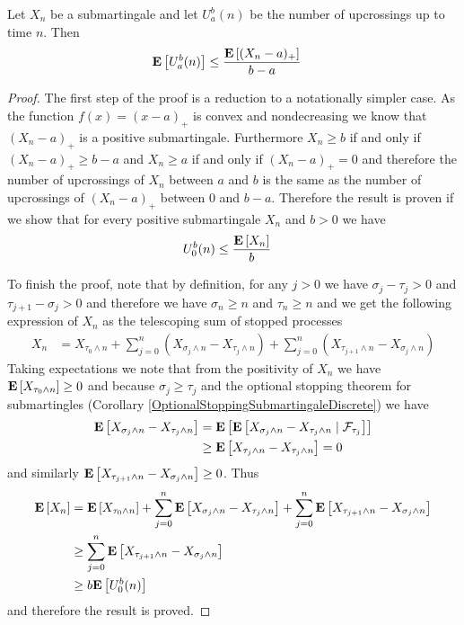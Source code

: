 \begin{lem}\label{UpcrossingInequalityDiscrete}Let $X_n$ be a
  submartingale and let $U_a^b(n)$ be the number of upcrossings up to
  time $n$.  Then
\begin{align*}
\expectation{U_a^b(n)} &\leq \frac{\expectation{(X_n-a)_+}}{b-a}
\end{align*}
\end{lem}
\begin{proof}
The first step of the proof is a reduction to a notationally simpler
case.  As the function $f(x) = (x -a)_+$ is convex and nondecreasing we know
that $(X_n - a)_+$ is a positive submartingale.  Furthermore $X_n \geq b$ if
and only if $(X_n - a)_+ \geq b-a$ and $X_n \geq a$ if and only if
$(X_n -a)_+ = 0$ and therefore the number of upcrossings of $X_n$
between $a$ and $b$ is the same as the number of upcrossings of $(X_n
- a)_+$ between $0$ and $b-a$.  Therefore the result is proven if we
show that for every positive submartingale $X_n$ and $b>0$ we have 
\begin{align*}
U_0^b (n) &\leq \frac{\expectation{X_n}}{b}
\end{align*}

To finish the proof, note that by definition, for any $j>0$ we have $\sigma_j -
\tau_j > 0$ and $\tau_{j+1} - \sigma_j > 0$ and therefore we have
$\sigma_n \geq n$ and $\tau_n \geq n$ and we get the following
expression of $X_n$ as the telescoping sum of stopped processes
\begin{align*}
X_n &= X_{\tau_0 \wedge n} + \sum_{j=0}^n \left ( X_{\sigma_j \wedge n} - X_{\tau_j
    \wedge n} \right) + \sum_{j=0}^n \left ( X_{\tau_{j+1} \wedge n} - X_{\sigma_j
    \wedge n} \right)
\end{align*}
Taking expectations we note that from the positivity of $X_n$ we have
$\expectation{X_{\tau_0 \wedge n}}\geq 0$ and because $\sigma_j \geq
\tau_j$ and the optional stopping theorem for submartingles
(Corollary \ref{OptionalStoppingSubmartingaleDiscrete}) we have
\begin{align*}
\expectation{X_{\sigma_j \wedge n} - X_{\tau_j    \wedge n} } &=
\expectation{\cexpectationlong{\mathcal{F}_{\tau_j}}{X_{\sigma_j \wedge n}
    - X_{\tau_j    \wedge n}}} \\
&\geq \expectation{X_{\tau_j \wedge n}
    - X_{\tau_j    \wedge n}} = 0\\
\end{align*}
and similarly $\expectation{X_{\tau_{j+1} \wedge n} - X_{\sigma_j
    \wedge n} } \geq 0$.   Thus
\begin{align*}
\expectation{X_n} &= \expectation{X_{\tau_0 \wedge n}} + 
\sum_{j=0}^n \expectation{ X_{\sigma_j \wedge n} - X_{\tau_j \wedge n}} + 
\sum_{j=0}^n \expectation{X_{\tau_{j+1} \wedge n} - X_{\sigma_j \wedge n}} \\
&\geq \sum_{j=0}^n \expectation{X_{\tau_{j+1} \wedge n} - X_{\sigma_j \wedge n}} \\
&\geq b \expectation{U_0^b(n)}
\end{align*}
and therefore the result is proved.
\end{proof}

